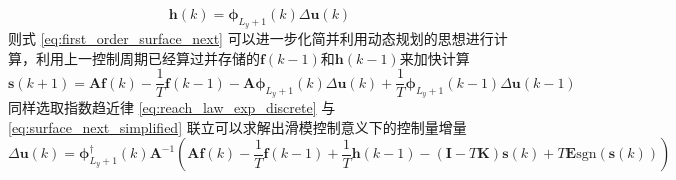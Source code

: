     \begin{equation}
    \boldsymbol{h}(k) = \boldsymbol{\phi}_{L_y+1}(k) \Delta \boldsymbol{u}(k)
    \label{eq:h_k}
    \end{equation}
    则式 \eqref{eq:first_order_surface_next} 可以进一步化简并利用动态规划的思想进行计算，利用上一控制周期已经算过并存储的$\boldsymbol{f}(k - 1)$和$\boldsymbol{h}(k - 1)$来加快计算
    \begin{equation}
    \boldsymbol{s}(k + 1) = \boldsymbol{A} \boldsymbol{f}(k) - \frac{1}{T} \boldsymbol{f}(k - 1) - \boldsymbol{A} \boldsymbol{\phi}_{L_y+1}(k) \Delta \boldsymbol{u}(k) + \frac{1}{T} \boldsymbol{\phi}_{L_y+1}(k - 1) \Delta \boldsymbol{u}(k - 1)
    \label{eq:surface_next_simplified}
    \end{equation}
    同样选取指数趋近律 \eqref{eq:reach_law_exp_discrete} 与 \eqref{eq:surface_next_simplified} 联立可以求解出滑模控制意义下的控制量增量
    \begin{equation}
    \Delta \boldsymbol{u}(k) = \boldsymbol{\phi}_{L_y+1}^\dagger(k) \boldsymbol{A}^{-1} \left( \boldsymbol{A} \boldsymbol{f}(k) - \frac{1}{T} \boldsymbol{f}(k - 1) + \frac{1}{T} \boldsymbol{h}(k - 1) - (\boldsymbol{I} - T \boldsymbol{K}) \boldsymbol{s}(k) + T \boldsymbol{E} \mathrm{sgn}(\boldsymbol{s}(k)) \right)
    \label{eq:smc_control_increment_final}
    \end{equation}



    \renewcommand{\algorithmicrequire}{\textbf{输入：}\unskip}
    \renewcommand{\algorithmicensure}{\textbf{输出：}\unskip}

